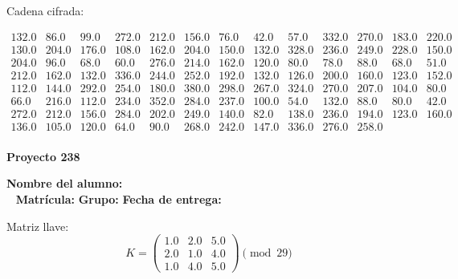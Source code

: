 \documentclass[12pt]{article}
\begin{document}
Cadena cifrada:
\begin{center}
$\begin{array}{lllllllllllll}
132.0 & 86.0 & 99.0 & 272.0 & 212.0 & 156.0 & 76.0 & 42.0 & 57.0 & 332.0 & 270.0 & 183.0 & 220.0\\
130.0 & 204.0 & 176.0 & 108.0 & 162.0 & 204.0 & 150.0 & 132.0 & 328.0 & 236.0 & 249.0 & 228.0 & 150.0\\
204.0 & 96.0 & 68.0 & 60.0 & 276.0 & 214.0 & 162.0 & 120.0 & 80.0 & 78.0 & 88.0 & 68.0 & 51.0\\
212.0 & 162.0 & 132.0 & 336.0 & 244.0 & 252.0 & 192.0 & 132.0 & 126.0 & 200.0 & 160.0 & 123.0 & 152.0\\
112.0 & 144.0 & 292.0 & 254.0 & 180.0 & 380.0 & 298.0 & 267.0 & 324.0 & 270.0 & 207.0 & 104.0 & 80.0\\
66.0 & 216.0 & 112.0 & 234.0 & 352.0 & 284.0 & 237.0 & 100.0 & 54.0 & 132.0 & 88.0 & 80.0 & 42.0\\
272.0 & 212.0 & 156.0 & 284.0 & 202.0 & 249.0 & 140.0 & 82.0 & 138.0 & 236.0 & 194.0 & 123.0 & 160.0\\
136.0 & 105.0 & 120.0 & 64.0 & 90.0 & 268.0 & 242.0 & 147.0 & 336.0 & 276.0 & 258.0\\
\end{array}$
\end{center}

\newpage


\textbf{Proyecto 238}

\textbf{Nombre del alumno:} \underline{\hspace{13cm}}\\\
\vspace{1cm}
\textbf{Matrícula:} \underline{\hspace{4cm}} \hspace{1cm}
\textbf{Grupo:} \underline{\hspace{2cm}}
\textbf{Fecha de entrega:} \underline{\hspace{2cm}}

\medskip

Matriz llave:
\[
K = \begin{pmatrix}
1.0 & 2.0 & 5.0\\
2.0 & 1.0 & 4.0\\
1.0 & 4.0 & 5.0
\end{pmatrix} \pmod{29}
\]
\end{document}

